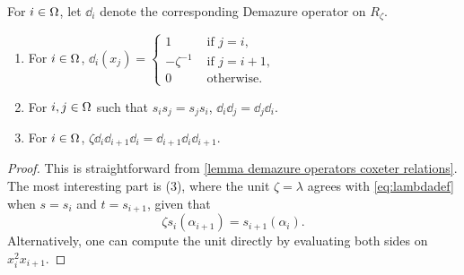 \begin{lemma}\label{lemma demazure operators computation deformed affine}
For $i \in \Omega$, let $\dd_i$ denote the corresponding Demazure operator on $R_{\zeta}$.
\begin{enumerate}
    \item For $i \in \Omega$, $\dd_i(x_j)=\begin{cases}
        1 &\text{ if $j=i$,}\\
        -\zeta^{-1} &\text{ if $j=i+1$,}\\
        0 &\text{ otherwise.}
    \end{cases}$
    \item For $i,j \in \Omega$ such that $s_is_j=s_js_i$, $\dd_i \dd_j= \dd_j \dd_i$.
    \item For $i \in \Omega$, $\zeta \dd_{i}\dd_{i+1}\dd_{i}=\dd_{i+1}\dd_i\dd_{i+1}.$
    \end{enumerate}
\end{lemma}
\begin{proof}
    This is straightforward from \cref{lemma demazure operators coxeter relations}. The most interesting part is (3), where the unit $\zeta = \lambda$ agrees with \eqref{eq:lambdadef} when $s = s_i$ and $t = s_{i+1}$, given that
    \begin{equation} \zeta s_i(\alpha_{i+1}) = s_{i+1}(\alpha_i). \end{equation}
    Alternatively, one can compute the unit directly by evaluating both sides on $x_i^2x_{i+1}$.

\end{proof}


